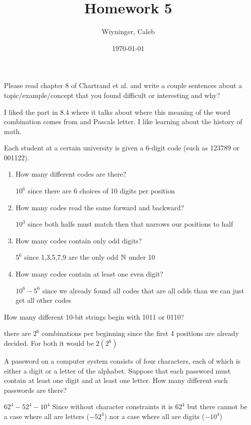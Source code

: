 \documentclass{homework}
\author{Wiyninger, Caleb}  %
\date{\today}  %
\title{Homework 5}
\begin{document}
 
\maketitle

\question Please read chapter 8 of Chartrand et al. and write a couple sentences about a topic/example/concept that you found difficult or interesting and why?

\begin{sol}
  I liked the part in 8.4 where it talks about where this meaning of the word combination comes from and Pascals letter. I like learning about the history of math. 
\end{sol}

\question Each student at a certain university is given a 6-digit code (such as 123789 or 001122).
\begin{enumerate}[label=(\alph*)]
    \item How many different codes are there?
      \begin{sol}
      $10^6$ since there are 6 choices of 10 digits per position
      \end{sol}
    \item How many codes read the same forward and backward?
      \begin{sol}
        $10^3$ since both halfs must match then that narrows our positions to half
      \end{sol}
    \item How many codes contain only odd digits?
      \begin{sol}
        $5^6$ since 1,3,5,7,9 are the only odd $\mathbb{N}$ under 10
      \end{sol}
    \item How many codes contain at least one even digit?
      \begin{sol}
      $10^6 - 5^6$ since we already found all codes that are all odds than we can just get all other codes
      \end{sol}
\end{enumerate}
 
\question How many different 10-bit strings begin with 1011 or 0110?
\begin{sol}
  there are $2^6$ combinations per beginning since the first 4 positions are already decided. For both it would be $2(2^6)$
\end{sol}

\question A password on a computer system consists of four characters, each of which is either a digit or a letter of the alphabet. Suppose that each password must contain at least one digit and at least one letter. How many different such passwords are there?
\begin{sol}
  $62^4 - 52^4 - 10^4$ Since without character constraints it is $62^4$ but there cannot be a case where all are letters ($-52^4$) nor a case where all are digits ($-10^4$)
\end{sol}
\end{document}
